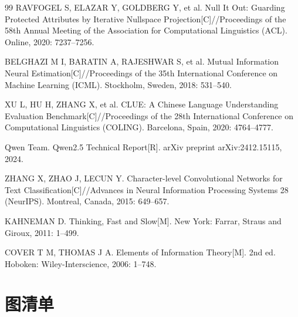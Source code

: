 \documentclass[12pt,a4paper,oneside]{ctexart}
\begin{document}
\begin{thebibliography}{99}
RAVFOGEL S, ELAZAR Y, GOLDBERG Y, et al. Null It Out: Guarding Protected Attributes by Iterative Nullspace Projection[C]//Proceedings of the 58th Annual Meeting of the Association for Computational Linguistics (ACL). Online, 2020: 7237--7256.

BELGHAZI M I, BARATIN A, RAJESHWAR S, et al. Mutual Information Neural Estimation[C]//Proceedings of the 35th International Conference on Machine Learning (ICML). Stockholm, Sweden, 2018: 531--540.

XU L, HU H, ZHANG X, et al. CLUE: A Chinese Language Understanding Evaluation Benchmark[C]//Proceedings of the 28th International Conference on Computational Linguistics (COLING). Barcelona, Spain, 2020: 4764--4777.

Qwen Team. Qwen2.5 Technical Report[R]. arXiv preprint arXiv:2412.15115, 2024.

ZHANG X, ZHAO J, LECUN Y. Character-level Convolutional Networks for Text Classification[C]//Advances in Neural Information Processing Systems 28 (NeurIPS). Montreal, Canada, 2015: 649--657.

KAHNEMAN D. Thinking, Fast and Slow[M]. New York: Farrar, Straus and Giroux, 2011: 1--499.

COVER T M, THOMAS J A. Elements of Information Theory[M]. 2nd ed. Hoboken: Wiley-Interscience, 2006: 1--748.

\end{thebibliography}

\appendix
\section{图清单}
\end{document}
